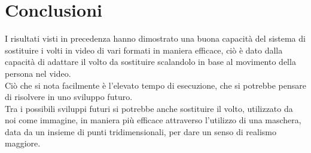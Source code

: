 \documentclass{report}
\begin{document}
\chapter{Conclusioni}
I risultati visti in precedenza hanno dimostrato una buona capacità del sistema di sostituire i volti in video di vari formati in maniera efficace, ciò è dato dalla capacità di adattare il volto da sostituire scalandolo in base al movimento della persona nel video. \\
Ciò che si nota facilmente è l’elevato tempo di esecuzione, che si potrebbe pensare di risolvere in uno sviluppo futuro. \\
Tra i possibili sviluppi futuri si potrebbe anche sostituire il volto, utilizzato da noi come immagine, in maniera più efficace attraverso l’utilizzo di una maschera, data da un insieme di punti tridimensionali, per dare un senso di realismo maggiore. \\

\nocite{*}


\end{document}
